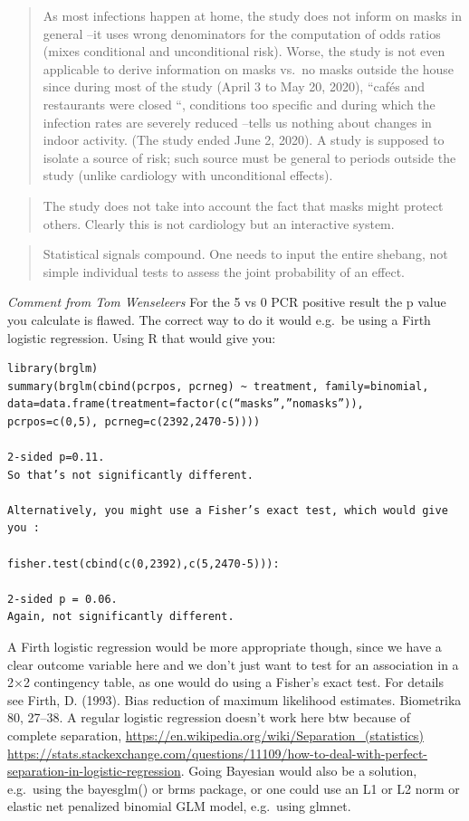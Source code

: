 \documentclass[
]{book}
\begin{document}
\begin{quote}
As most infections happen at home, the study does not inform on masks in general --it uses wrong denominators for the computation of odds ratios (mixes conditional and unconditional risk). Worse, the study is not even applicable to derive information on masks vs.~no masks outside the house since during most of the study (April 3 to May 20, 2020), ``cafés and restaurants were closed ``, conditions too specific and during which the infection rates are severely reduced --tells us nothing about changes in indoor activity. (The study ended June 2, 2020). A study is supposed to isolate a source of risk; such source must be general to periods outside the study (unlike cardiology with unconditional effects).
\end{quote}

\begin{quote}
The study does not take into account the fact that masks might protect others. Clearly this is not cardiology but an interactive system.
\end{quote}

\begin{quote}
Statistical signals compound. One needs to input the entire shebang, not simple individual tests to assess the joint probability of an effect.
\end{quote}

\emph{Comment from Tom Wenseleers}
For the 5 vs 0 PCR positive result the p value you calculate is flawed. The correct way to do it would e.g.~be using a Firth logistic regression. Using R that would give you:

\begin{verbatim}
library(brglm)
summary(brglm(cbind(pcrpos, pcrneg) ~ treatment, family=binomial, data=data.frame(treatment=factor(c(“masks”,”nomasks”)),
pcrpos=c(0,5), pcrneg=c(2392,2470-5))))

2-sided p=0.11.
So that’s not significantly different.

Alternatively, you might use a Fisher’s exact test, which would give you :

fisher.test(cbind(c(0,2392),c(5,2470-5))):

2-sided p = 0.06.
Again, not significantly different.
\end{verbatim}

A Firth logistic regression would be more appropriate though, since we have a clear outcome variable here and we don't just want to test for an association in a 2×2 contingency table, as one would do using a Fisher's exact test. For details see Firth, D. (1993). Bias reduction of maximum likelihood estimates. Biometrika 80, 27--38. A regular logistic regression doesn't work here btw because of complete separation, \url{https://en.wikipedia.org/wiki/Separation_(statistics)} \url{https://stats.stackexchange.com/questions/11109/how-to-deal-with-perfect-separation-in-logistic-regression}. Going Bayesian would also be a solution, e.g.~using the bayesglm() or brms package, or one could use an L1 or L2 norm or elastic net penalized binomial GLM model, e.g.~using glmnet.
\end{document}

